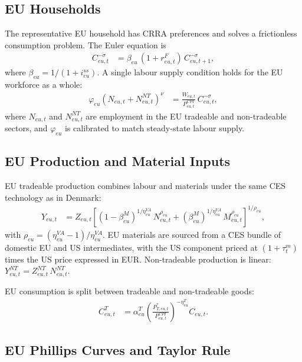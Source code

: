 \documentclass[12pt,a4paper]{article}
\begin{document}
\subsection{EU Households}

The representative EU household has CRRA preferences and solves a frictionless consumption problem. The Euler equation is
\begin{align}
    C_{eu,t}^{-\sigma} &= \beta_{eu}\,(1+r^F_{eu,t})\,C_{eu,t+1}^{-\sigma},
    \label{eq:Euler_eu}
\end{align}
where $\beta_{eu} = 1/(1+i^{ss}_{eu})$. A single labour supply condition holds for the EU workforce as a whole:
\begin{align}
    \varphi_{eu}\!\left(N_{eu,t} + N^{NT}_{eu,t}\right)^{\!\nu} &= \frac{W_{eu,t}}{P^{CPI}_{eu,t}}\,C_{eu,t}^{-\sigma},
    \label{eq:LS_eu}
\end{align}
where $N_{eu,t}$ and $N^{NT}_{eu,t}$ are employment in the EU tradeable and non-tradeable sectors, and $\varphi_{eu}$ is calibrated to match steady-state labour supply.

\subsection{EU Production and Material Inputs}

EU tradeable production combines labour and materials under the same CES technology as in Denmark:
\begin{align}
    Y_{eu,t} &= Z_{eu,t}\left[
        (1-\beta^M_{eu})^{1/\eta^{VA}_{eu}}\,N_{eu,t}^{\rho_{eu}}
        + (\beta^M_{eu})^{1/\eta^{VA}_{eu}}\,M_{eu,t}^{\rho_{eu}}
    \right]^{\!1/\rho_{eu}},
    \label{eq:Y_eu}
\end{align}
with $\rho_{eu} = (\eta^{VA}_{eu}-1)/\eta^{VA}_{eu}$. EU materials are sourced from a CES bundle of domestic EU and US intermediates, with the US component priced at $(1+\tau^m_t)$ times the US price expressed in EUR. Non-tradeable production is linear: $Y^{NT}_{eu,t} = Z^{NT}_{eu,t}\,N^{NT}_{eu,t}$.

EU consumption is split between tradeable and non-tradeable goods:
\begin{align}
    C^T_{eu,t} &= \alpha^T_{eu}\!\left(\frac{P^*_{T,eu,t}}{P^{CPI}_{eu,t}}\right)^{-\eta^T_{eu}} C_{eu,t}.
    \label{eq:CT_eu}
\end{align}

\subsection{EU Phillips Curves and Taylor Rule}
\end{document}
